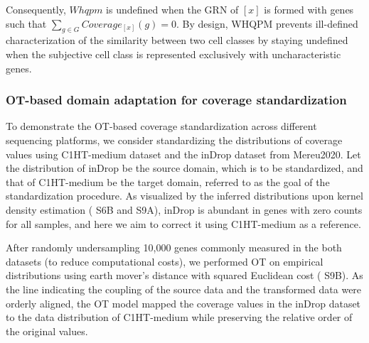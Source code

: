 \documentclass{article}
\begin{document}
Consequently, $Whqpm$ is undefined when the GRN of $[x]$ is formed with genes such that $\sum_{g\in G}Coverage_{[x]}(g)=0$. 
By design, WHQPM prevents ill-defined characterization of the similarity between two cell classes by staying 
undefined when the subjective cell class is represented exclusively with uncharacteristic genes.

\subsubsection*{
  OT-based domain adaptation for coverage standardization
}
To demonstrate the OT-based coverage standardization across different sequencing platforms, we consider standardizing 
the distributions of coverage values using C1HT-medium dataset and the inDrop dataset from Mereu2020. 
Let the distribution of inDrop be the source domain, which is to be standardized, and that of C1HT-medium be the 
target domain, referred to as the goal of the standardization procedure. As visualized by the inferred distributions 
upon kernel density estimation (\figurename{ S6B and S9A}), inDrop is abundant in genes with zero counts for all samples, 
and here we aim to correct it using C1HT-medium as a reference.

After randomly undersampling 10,000 genes commonly measured in the both datasets (to reduce computational 
costs), we performed OT on empirical distributions using earth mover's distance with squared Euclidean cost (\figurename{ S9B}). 
As the line indicating the coupling of the source data and the transformed data were orderly aligned, the OT 
model mapped the coverage values in the inDrop dataset to the data distribution of C1HT-medium while preserving 
the relative order of the original values.
\end{document}
